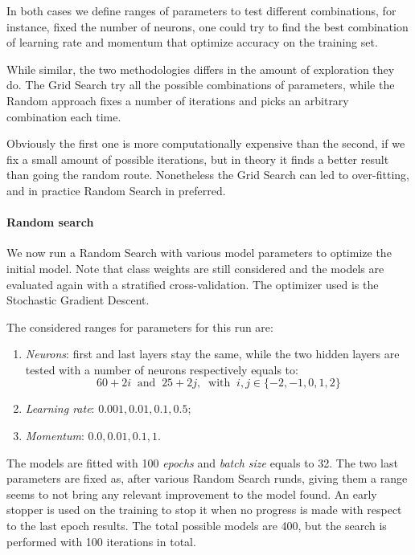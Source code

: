 In both cases we define ranges of parameters to test different combinations, 
for instance, fixed the number of neurons, one could try to find the best 
combination of learning rate and momentum that optimize accuracy on the training set.

While similar, the two methodologies differs in the amount of exploration they do.
The Grid Search try all the possible combinations of parameters, while the 
Random approach fixes a number of iterations and picks an arbitrary combination each time. 

Obviously the first one is more computationally expensive than the second, if 
we fix a small amount of possible iterations, but in theory it finds a better result
than going the random route. 
Nonetheless the Grid Search can led to over-fitting, and in practice Random 
Search in preferred.

\paragraph{Random search}
We now run a Random Search with various model parameters 
to optimize the initial model.
Note that class weights are still considered and the models are evaluated
again with a stratified cross-validation.
The optimizer used is the Stochastic Gradient Descent.

The considered ranges for parameters for this run are: 
\begin{enumerate}
    \item \emph{Neurons}: first and last layers stay the same, while 
    the two hidden layers are tested with a number of neurons respectively 
    equals to: 
    $$60 + 2i\;\;\text{and}\;\;25 + 2j,\;\;\text{with}\;\; i, j \in \{-2,-1,0,1,2\}$$
    \item \emph{Learning rate}: $0.001, 0.01, 0.1, 0.5$;
    \item \emph{Momentum}: $0.0, 0.01, 0.1, 1$.
\end{enumerate}

The models are fitted with 100 \emph{epochs} and \emph{batch size} equals to 32.
The two last parameters are fixed as, after various Random Search runds, 
giving them a range seems to not bring any relevant 
improvement to the model found.
An early stopper is used on the training to stop it when no progress is made with 
respect to the last epoch results.
The total possible models are 400, but the search is performed with 100 iterations
in total.

